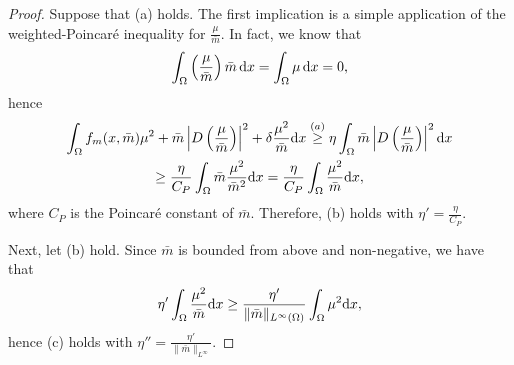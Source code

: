 \documentclass[10pt,a4paper,nouppercase,nowrite]{article}
\numberwithin{equation}{section}
\newcommand{\di}{{\rm d}}
\theoremstyle{definition}
\begin{document}
\begin{proof}
	Suppose that (a) holds. The first implication is a simple application of the weighted-Poincar\'e inequality for $\frac{\mu}{\bar{m}}$. In fact, we know that
	\begin{equation*}
		\int_{\Omega} \left( \frac{\mu}{\bar{m}} \right) \bar{m} \, \di x =  \int_{\Omega} \mu \, \di x = 0,
	\end{equation*}
	hence
	\begin{multline*}
		\int_{\Omega} f_m(x,\bar{m}) \mu^2 + \bar{m} \left| D\left( \frac{\mu}{\bar{m}} \right) \right|^2 + \delta \frac{\mu^2}{\bar{m}} \di x \overset{(a)}{\geq} \eta \int_{\Omega} \bar{m} \left| D\left( \frac{\mu}{\bar{m}} \right) \right|^2 \di x \\ \geq \frac{\eta}{C_P} \int_{\Omega} \bar{m} \frac{\mu^2}{\bar{m}^2} \di x = \frac{\eta}{C_P} \int_{\Omega} \frac{\mu^2}{\bar{m}} \di x,
	\end{multline*}
	where $C_P$ is the Poincar\'e constant of $\bar{m}$. Therefore, (b) holds with $\eta'=\frac{\eta}{C_P}$. 
	
	Next, let (b) hold. Since $\bar{m}$ is bounded from above and non-negative, we have that
	\begin{equation*}
		\eta' \int_{\Omega} \frac{\mu^2}{\bar{m}} \di x %
		\geq \frac{\eta'}{\|\bar{m}\|_{L^{\infty}(\Omega)}} \int_{\Omega} \mu^2 \di x,
	\end{equation*}
	hence (c) holds with $\eta''=\frac{\eta'}{\| \bar{m} \|_{L^{\infty}}}$.
	

\end{proof}
\end{document}
